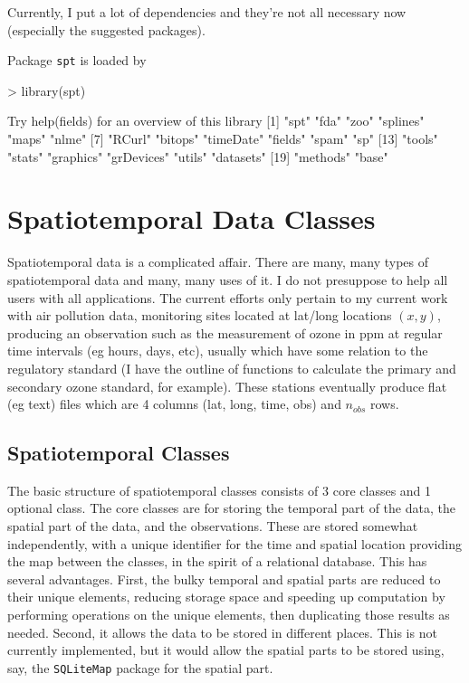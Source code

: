 \documentclass{article}
\begin{document}
Currently, I put a lot of dependencies and they're not all necessary
now (especially the suggested packages).  

Package {\tt spt} is loaded by 
\begin{Schunk}
\begin{Sinput}
> library(spt)
\end{Sinput}
\begin{Soutput}
 Try help(fields) for an overview of this library 
 [1] "spt"       "fda"       "zoo"       "splines"   "maps"      "nlme"     
 [7] "RCurl"     "bitops"    "timeDate"  "fields"    "spam"      "sp"       
[13] "tools"     "stats"     "graphics"  "grDevices" "utils"     "datasets" 
[19] "methods"   "base"     
\end{Soutput}
\end{Schunk}


\section*{Spatiotemporal Data Classes}
Spatiotemporal data is a complicated affair.  There are many, many
types of spatiotemporal data and many, many uses of it. I do not
presuppose to help all users with all applications.  The current
efforts only pertain to my current work with air pollution data,
monitoring sites located at lat/long locations $(x,y)$, producing an
observation such as the measurement of ozone in ppm at regular time
intervals (eg hours, days, etc), usually which have some relation to
the regulatory standard (I have the outline of functions to calculate the
primary and secondary ozone standard, for example).  These stations eventually produce
flat (eg text) files which are 4 columns (lat, long, time, obs) and
$n_{obs}$ rows.


\subsection*{Spatiotemporal Classes}
The basic structure of spatiotemporal classes consists of 3 core
classes and 1 optional class.  The core classes are for storing the
temporal part of the data, the spatial part of the data, and the
observations.  These are stored somewhat independently, with a unique
identifier for the time and spatial location providing the map between
the classes, in the spirit of a relational database.  This has several
advantages. First, the bulky temporal and spatial parts are reduced
to their unique elements, reducing storage space and speeding up
computation by performing operations on the unique elements, then
duplicating those results as needed.  Second, it allows the data to be
stored in different places.  This is not currently implemented, but it
would allow the spatial parts to be stored using, say, the
\texttt{SQLiteMap} package for the spatial part.  
\end{document}
